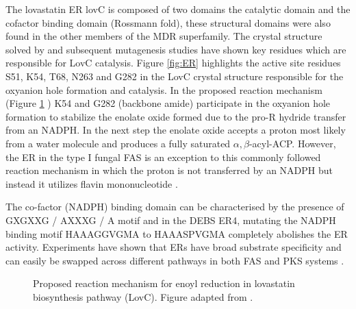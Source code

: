 			The lovastatin ER lovC is composed of two domains the catalytic domain and the cofactor binding domain (Rossmann fold), these structural domains were also found in the other members of the MDR superfamily. The crystal structure solved by \textcite{Ames2012} and subsequent mutagenesis studies have shown key residues which are responsible for LovC catalysis. Figure \ref{fig:ER} highlights the active site residues S51, K54, T68, N263 and G282 in the LovC crystal structure responsible for the oxyanion hole formation and catalysis. In the proposed reaction mechanism (Figure \ref{fig:ERreact} ) K54 and G282 (backbone amide) participate in the oxyanion hole formation to stabilize the enolate oxide formed due to the pro-R hydride transfer from an NADPH. In the next step the enolate oxide accepts a proton most likely from a water molecule and produces a fully saturated $\alpha,\beta$-acyl-ACP. However, the ER in the type I fungal FAS is an exception to this commonly followed reaction mechanism in which the proton is not transferred by an NADPH but instead it utilizes flavin mononucleotide \parencite{Ha2006}. 
			
			The co-factor (NADPH) binding domain  can be characterised by the presence of GXGXXG / AXXXG / A motif and in the DEBS ER4, mutating the NADPH binding motif HAAAGGVGMA to HAAASPVGMA completely abolishes the ER activity. Experiments have shown that ERs have broad substrate specificity and can easily be swapped across different pathways in both FAS and PKS systems \parencite{Khosla1999, Witkowski2004a, Khosla2007}.

			\setlength\fboxsep{5pt}
 			\setlength\fboxrule{1.5pt}
			\begin{figure} []
			\centering
			\caption[Proposed reaction mechanism for enoyl reduction]{Proposed reaction mechanism for enoyl reduction in lovastatin biosynthesis pathway (LovC). Figure adapted from \parencite{Ames2012}.}
			\label{fig:ERreact}
			\end{figure}			
						
